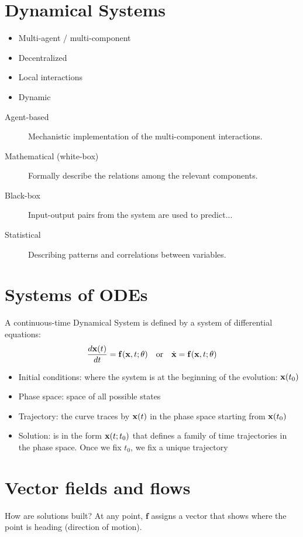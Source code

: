 \section*{Dynamical Systems}

\begin{itemize}
    \item Multi-agent / multi-component
    \item Decentralized
    \item Local interactions
    \item Dynamic
\end{itemize}

\begin{description}
    \item[Agent-based] Mechanistic implementation of the multi-component interactions.
    \item[Mathematical (white-box)] Formally describe the relations among the relevant components.
    \item[Black-box] Input-output pairs from the system are used to predict...
    \item[Statistical] Describing patterns and correlations between variables.
\end{description}

\section*{Systems of ODEs}

A continuous-time Dynamical System is defined by a system of differential equations:
\[
\frac{d\mathbf{x}(t)}{dt} = \mathbf{f}(\mathbf{x}, t; \theta) \quad \text{or} \quad \dot{\mathbf{x}} = \mathbf{f}(\mathbf{x}, t; \theta)
\]

\begin{itemize}
    \item Initial conditions: where the system is at the beginning of the evolution:
    $\mathbf{x}(t_0)$
    \item Phase space: space of all possible states
    \item Trajectory: the curve traces by $\mathbf{x}(t)$ in the phase space starting from $\mathbf{x}(t_0)$
    \item Solution: is in the form $\mathbf{x}(t; t_0)$ that defines a family of time trajectories
    in the phase space. Once we fix $t_0$, we fix a unique trajectory
\end{itemize}

\section*{Vector fields and flows}
How are solutions built? At any point, $\mathbf{f}$ assigns a vector
that shows where the point is heading (direction of motion).

